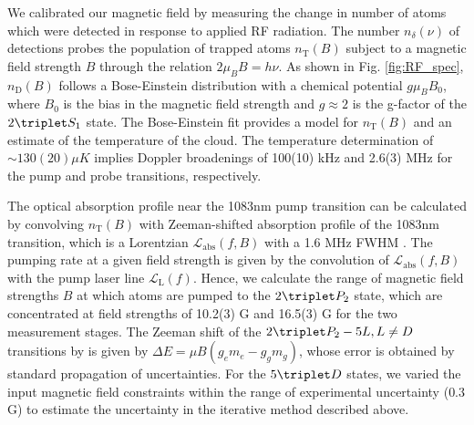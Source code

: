 {We calibrated our magnetic field by measuring the change in number of atoms which were detected in response to applied RF radiation.
The number $n_\delta(\nu)$ of detections probes the population of trapped atoms $n_\text{T}(B)$ subject to a magnetic field strength $B$ through the relation $2 \mu_B B = h \nu$. 
As shown in Fig. \ref{fig:RF_spec}, $n_\text{D}(B)$ follows a Bose-Einstein distribution with a chemical potential $g \mu_B B_0$, where $B_0$ is the bias in the magnetic field strength and $g\approx2$ is the g-factor of the $2\triplet S_1$ state.
The Bose-Einstein fit provides a model for $n_\text{T}(B)$ and an estimate of the temperature of the cloud. The temperature determination of $\sim130(20)\mu K$ implies Doppler broadenings of 100(10) kHz and 2.6(3) MHz for the pump and probe transitions, respectively.

The optical absorption profile near the 1083nm pump transition can be calculated by convolving $n_\text{T}(B)$ with Zeeman-shifted absorption profile of the 1083nm transition, which is a Lorentzian $\mathcal{L}_\text{abs}(f,B)$ with a 1.6 MHz FWHM \cite{Drake07}.
The pumping rate at a given field strength is given by the convolution of $\mathcal{L}_\text{abs}(f,B)$ with the pump laser line $\mathcal{L}_\text{L}(f)$.
Hence, we calculate the range of magnetic field strengths $B$ at which atoms are pumped to the $2\triplet P_2$ state, which are concentrated at field strengths of 10.2(3) G and 16.5(3) G for the two measurement stages. 
The Zeeman shift of the $2\triplet P_2 - 5L, L\neq D$ transitions by is given by $\Delta E = \mu B (g_e m_e-g_g m_g)$, whose error is obtained by standard propagation of uncertainties. 
For the $5\triplet D$ states, we varied the input magnetic field constraints within the range of experimental uncertainty ($0.3$G) to estimate the uncertainty in the iterative method described above.}


